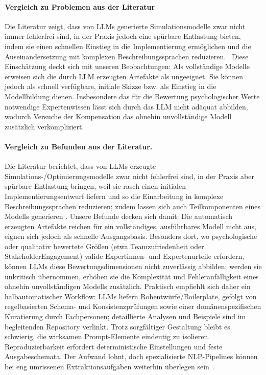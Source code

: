 \documentclass[runningheads]{llncs}
\begin{document}
\paragraph{Vergleich zu Problemen aus der Literatur}
Die Literatur zeigt, dass von LLMs generierte Simulationsmodelle zwar nicht immer fehlerfrei sind, in der Praxis jedoch eine spürbare Entlastung bieten, indem sie einen schnellen Einstieg in die Implementierung ermöglichen und die Auseinandersetzung mit komplexen Beschreibungssprachen reduzieren.~\cite{ref_article5} Diese Einschätzung deckt sich mit unseren Beobachtungen: Als vollständige Modelle erweisen sich die durch LLM erzeugten Artefakte als ungeeignet. Sie können jedoch als schnell verfügbare, initiale Skizze bzw. als Einstieg in die Modellbildung dienen. Insbesondere das für die Bewertung psychologischer Werte notwendige Expertenwissen lässt sich durch das LLM nicht adäquat abbilden, wodurch Versuche der Kompensation das ohnehin unvollständige Modell zusätzlich verkompliziert.

\paragraph{Vergleich zu Befunden aus der Literatur.}
Die Literatur berichtet, dass von LLMs erzeugte Simulations-/Optimierungsmodelle zwar nicht fehlerfrei sind, in der Praxis aber spürbare Entlastung bringen, weil sie rasch einen initialen Implementierungsentwurf liefern und so die Einarbeitung in komplexe Beschreibungssprachen reduzieren; zudem lassen sich auch Teilkomponenten eines Modells generieren \cite{ref_article5}. Unsere Befunde decken sich damit: Die automatisch erzeugten Artefakte reichen für ein vollständiges, ausführbares Modell nicht aus, eignen sich jedoch als schnelle Ausgangsbasis. Besonders dort, wo psychologische oder qualitativ bewertete Größen (etwa Teamzufriedenheit oder Stakeholder\-Engagement) valide Expertinnen- und Expertenurteile erfordern, können LLMs diese Bewertungsdimensionen nicht zuverlässig abbilden; werden sie unkritisch übernommen, erhöhen sie die Komplexität und Fehleranfälligkeit eines ohnehin unvollständigen Modells zusätzlich. Praktisch empfiehlt sich daher ein halbautomatischer Workflow: LLMs liefern Rohentwürfe/Boilerplate, gefolgt von regelbasierten Schema- und Konsistenzprüfungen sowie einer domänenspezifischen Kuratierung durch Fachpersonen; detaillierte Analysen und Beispiele sind im begleitenden Repository verlinkt. Trotz sorgfältiger Gestaltung bleibt es schwierig, die wirksamen Prompt-Elemente eindeutig zu isolieren. Reproduzierbarkeit erfordert deterministische Einstellungen und feste Ausgabeschemata. Der Aufwand lohnt, doch spezialisierte NLP-Pipelines können bei eng umrissenen Extraktionsaufgaben weiterhin überlegen sein~\cite{ref_proc1}.
\end{document}
